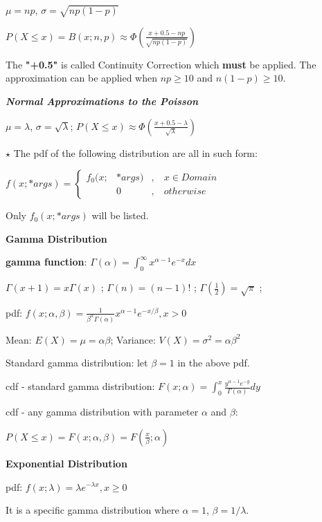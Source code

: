 \documentclass{article}
\newcommand{\bigtitle}[1]{
	\noindent
	\textbf{#1}
}
\newcommand{\smalltitle}[1]{
	\noindent
	\textbf{\textit{#1}}
}
\newcommand{\properframed}[1]{
	{
		\centering
		\vspace{-2 ex}
		\begin{framed}
			\vspace{-1.5 ex}
			#1
			\vspace{-1.5 ex}
		\end{framed}
		\vspace{-2 ex}
	}
}
\begin{document}
	$\mu = np$, $\sigma = \sqrt{np(1-p)}$
	
	$P(X\leq x) = B(x;n,p) \approx \Phi (\frac{x+0.5-np}{\sqrt{np(1-p)}})$
	
	The \textbf{"+0.5"} is called Continuity Correction which \textbf{must} be applied. The approximation can be applied when $np\geq 10$ and $n(1-p)\geq 10$.
	
	\smalltitle{Normal Approximations to the Poisson}
	
	$\mu = \lambda$, $\sigma = \sqrt{\lambda}$; 
	$P(X\leq x) \approx \Phi(\frac{x+0.5-\lambda}{\sqrt{\lambda}})$
	
	
	
	\noindent
	$\star$ The pdf of the following distribution are all in such form:
	
	$
	f(x;*args) = \left\{ 
	\begin{aligned}
	f_0(x; & *args) & , & \: x \in  Domain \\
	& 0      & , & \: otherwise
	\end{aligned}
	\right.
	$
	
	Only $f_0(x;*args)$ will be listed.
	
	
	
	
	\bigtitle{Gamma Distribution}
	
	\properframed{
		\textbf{gamma function}:
		$\Gamma(\alpha) = \int_{0}^{\infty}x^{\alpha-1}e^{-x}dx$
		
		\noindent
		$\Gamma(x+1) = x\Gamma(x)$ ;	 \quad
		$\Gamma(n) = (n-1)! $ ; \quad
		$\Gamma(\frac{1}{2}) = \sqrt{\pi}$ ;
	}
	
	pdf: $
	f(x;\alpha,\beta) = 
	\frac{1}{\beta ^\alpha \Gamma(\alpha)}  x^{\alpha-1}e^{-x/\beta}  , x > 0 
	$
	
	Mean: $E(X) = \mu = \alpha\beta$; 
	Variance: $V(X) = \sigma^2 = \alpha\beta^2$
	
	
	Standard gamma distribution: let $\beta = 1$ in the above pdf.
	
	cdf - standard gamma distribution: $F(x;\alpha) = \int_{0}^{x} \frac{y^{\alpha - 1}e^{-y}}{\Gamma(\alpha)}dy$
	
	cdf - any gamma distribution with parameter $\alpha$ and $\beta$:
	
	$P(X\leq x) = F(x;\alpha,\beta) = F(\frac{x}{\beta};\alpha)$
	
	
	
	\bigtitle{Exponential Distribution}
	
	pdf:
	$
	f(x;\lambda) = 
	\lambda e^{-\lambda x} , x\geq 0    
	$
	
	It is a specific gamma distribution where $\alpha = 1$, $\beta = 1/\lambda$.
	
\end{document}

